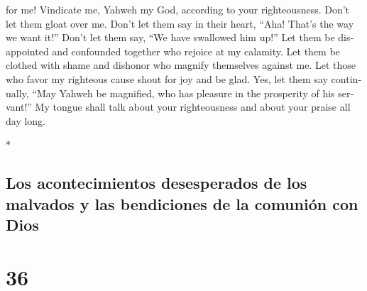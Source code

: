 \begin{paracol}{2}
\begin{otherlanguage}{english}
for me!  Vindicate me, Yahweh my God, according to your
righteousness. Don't let them gloat over me.  Don't let
them say in their heart, ``Aha! That's the way we want it!'' Don't let
them say, ``We have swallowed him up!''  Let them be
disappointed and confounded together who rejoice at my calamity. Let
them be clothed with shame and dishonor who magnify themselves against
me.  Let those who favor my righteous cause shout for joy
and be glad. Yes, let them say continually, ``May Yahweh be magnified,
who has pleasure in the prosperity of his servant!''  My
tongue shall talk about your righteousness and about your praise all day
long.

\end{otherlanguage}

\switchcolumn[0]*

\hypertarget{los-acontecimientos-desesperados-de-los-malvados-y-las-bendiciones-de-la-comuniuxf3n-con-dios}{%
\subsection{Los acontecimientos desesperados de los malvados y las
bendiciones de la comunión con
Dios}\label{los-acontecimientos-desesperados-de-los-malvados-y-las-bendiciones-de-la-comuniuxf3n-con-dios}}

\hypertarget{section-70}{%
\section{36}\label{section-70}}


\end{paracol}
